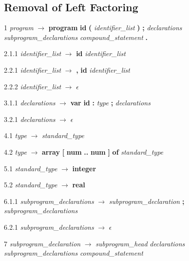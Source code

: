 
% 
\subsection*{Removal of Left Factoring}
1    \emph{program} $\rightarrow$ \textbf{program} \textbf{id} \textbf{(} \emph{identifier\_list} \textbf{)} \textbf{;} \emph{declarations} \emph{subprogram\_declarations} \emph{compound\_statement} \textbf{.}


2.1.1  \emph{identifier\_list} $\rightarrow$ \textbf{id} \emph{identifier\_list\textprime}

2.2.1  \emph{identifier\_list\textprime} $\rightarrow$ \textbf{,} \textbf{id} \emph{identifier\_list\textprime}

2.2.2 \emph{identifier\_list\textprime} $\rightarrow$ $\epsilon$

3.1.1  \emph{declarations} $\rightarrow$ \textbf{var} \textbf{id} \textbf{:} \emph{type} \textbf{;} \emph{declarations}

3.2.1  \emph{declarations} $\rightarrow$ $\epsilon$

4.1  \emph{type} $\rightarrow$ \emph{standard\_type}

4.2  \emph{type} $\rightarrow$ \textbf{array} \textbf{[} \textbf{num} \textbf{..} \textbf{num} \textbf{]} \textbf{of} \emph{standard\_type}

5.1  \emph{standard\_type} $\rightarrow$ \textbf{integer}

5.2  \emph{standard\_type} $\rightarrow$ \textbf{real}

6.1.1  \emph{subprogram\_declarations} $\rightarrow$ \emph{subprogram\_declaration} \textbf{;} \emph{subprogram\_declarations}

6.2.1  \emph{subprogram\_declarations} $\rightarrow$ $\epsilon$

7    \emph{subprogram\_declaration} $\rightarrow$ \emph{subprogram\_head} \emph{declarations} \emph{subprogram\_declarations} \emph{compound\_statement}

